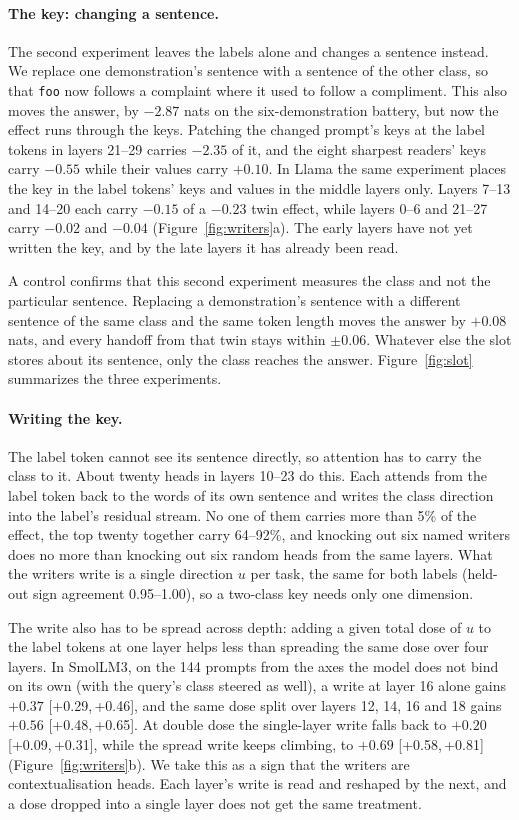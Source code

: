 \documentclass{article}
\newcommand{\ci}[2]{[#1,\,#2]}
\begin{document}
\paragraph{The key: changing a sentence.} The second experiment leaves the labels alone and changes a sentence instead. We replace one demonstration's sentence with a sentence of the other class, so that \texttt{foo} now follows a complaint where it used to follow a compliment. This also moves the answer, by $-2.87$ nats on the six-demonstration battery, but now the effect runs through the keys. Patching the changed prompt's keys at the label tokens in layers 21--29 carries $-2.35$ of it, and the eight sharpest readers' keys carry $-0.55$ while their values carry $+0.10$. In Llama the same experiment places the key in the label tokens' keys and values in the middle layers only. Layers 7--13 and 14--20 each carry $-0.15$ of a $-0.23$ twin effect, while layers 0--6 and 21--27 carry $-0.02$ and $-0.04$ (Figure~\ref{fig:writers}a). The early layers have not yet written the key, and by the late layers it has already been read.

A control confirms that this second experiment measures the class and not the particular sentence. Replacing a demonstration's sentence with a different sentence of the same class and the same token length moves the answer by $+0.08$ nats, and every handoff from that twin stays within $\pm0.06$. Whatever else the slot stores about its sentence, only the class reaches the answer. Figure~\ref{fig:slot} summarizes the three experiments.

\paragraph{Writing the key.} The label token cannot see its sentence directly, so attention has to carry the class to it. About twenty heads in layers 10--23 do this. Each attends from the label token back to the words of its own sentence and writes the class direction into the label's residual stream. No one of them carries more than 5\% of the effect, the top twenty together carry 64--92\%, and knocking out six named writers does no more than knocking out six random heads from the same layers. What the writers write is a single direction $u$ per task, the same for both labels (held-out sign agreement 0.95--1.00), so a two-class key needs only one dimension.

The write also has to be spread across depth: adding a given total dose of $u$ to the label tokens at one layer helps less than spreading the same dose over four layers. In SmolLM3, on the 144 prompts from the axes the model does not bind on its own (with the query's class steered as well), a write at layer 16 alone gains $+0.37$ \ci{+0.29}{+0.46}, and the same dose split over layers 12, 14, 16 and 18 gains $+0.56$ \ci{+0.48}{+0.65}. At double dose the single-layer write falls back to $+0.20$ \ci{+0.09}{+0.31}, while the spread write keeps climbing, to $+0.69$ \ci{+0.58}{+0.81} (Figure~\ref{fig:writers}b). We take this as a sign that the writers are contextualisation heads. Each layer's write is read and reshaped by the next, and a dose dropped into a single layer does not get the same treatment.
\end{document}
